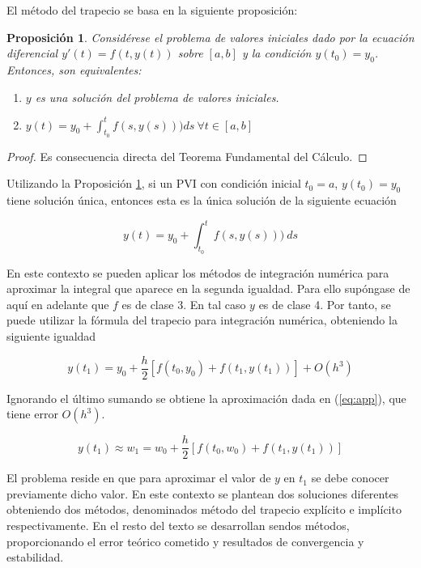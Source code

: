 \documentclass{article}
\theoremstyle{theorem-style}  %
\newtheorem{proposition}[theorem]{Proposición}
\theoremstyle{definition-style}
\theoremstyle{example-style}
\begin{document}
	El método del trapecio se basa en la siguiente proposición:

	\begin{proposition} \label{prop:sol-eq}
		Considérese el problema de valores iniciales dado por la ecuación diferencial $y'(t) = f(t,y(t))$ sobre $[a,b]$ y la condición $y(t_0) = y_0$.  Entonces, son equivalentes:
		\begin{enumerate}
			\item $y$ es una solución del problema de valores iniciales.
			\item $y(t) = y_0 + \int_{t_0}^{t} f(s,y(s))) ds \ \forall t \in [a,b]$
		\end{enumerate}
	\end{proposition}

	\begin{proof}
		Es consecuencia directa del Teorema Fundamental del Cálculo.
	\end{proof}

	Utilizando la Proposición \ref{prop:sol-eq}, si un PVI con condición inicial $t_0 = a$, $y(t_0) = y_0$ tiene solución única, entonces esta es la única solución de la siguiente ecuación

	\begin{equation}
		y(t)  = y_0 + \int_{t_0}^{t} f(s,y(s))) \ ds
	\end{equation}

	En este contexto se pueden aplicar los métodos de integración numérica para aproximar la integral que aparece en la segunda igualdad. Para ello supóngase de aquí en adelante que $f$ es de clase 3. En tal caso $y$ es de clase 4. Por tanto, se puede utilizar la fórmula del trapecio para integración numérica, obteniendo la siguiente igualdad

	\begin{equation} \label{eq:trapecio-igualdad}
		y(t_{1}) = y_0 + \frac{h}{2} \left[f(t_0,y_0) + f(t_1, y(t_1))\right] + O(h^3)
	\end{equation}


	 Ignorando el último sumando se obtiene la aproximación dada en (\ref{eq:app}), que tiene error $O(h^3)$.

	\begin{equation} \label{eq:app}
		y(t_1) \approx w_1 = w_0 + \frac{h}{2} \left[f(t_0,w_0) + f(t_1, y(t_1))\right]
	\end{equation}

	El problema reside en que para aproximar el valor de $y$ en $t_1$ se debe conocer previamente dicho valor. En este contexto se plantean dos soluciones diferentes obteniendo dos métodos, denominados método del trapecio explícito e implícito respectivamente. En el resto del texto se desarrollan sendos métodos, proporcionando el error teórico cometido y resultados de convergencia y estabilidad.
\end{document}
